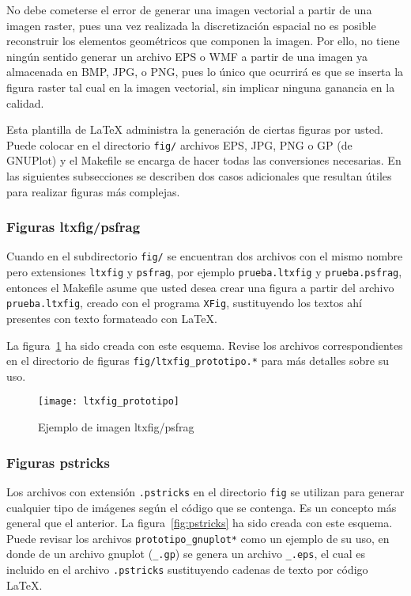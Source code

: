 No debe cometerse el error de generar una imagen vectorial a partir de una
imagen raster, pues una vez realizada la discretización espacial no es posible
reconstruir los elementos geométricos que componen la imagen. Por ello, no
tiene ningún sentido generar un archivo EPS o WMF a partir de una imagen ya
almacenada en BMP, JPG, o PNG, pues lo único que ocurrirá es que se inserta la
figura raster tal cual en la imagen vectorial, sin implicar ninguna ganancia en
la calidad.

Esta plantilla de LaTeX administra la generación de ciertas figuras por usted.
Puede colocar en el directorio \texttt{fig/} archivos EPS, JPG, PNG o GP (de
GNUPlot) y el Makefile se encarga de hacer todas las conversiones necesarias.
En las siguientes subsecciones se describen dos casos adicionales que resultan
útiles para realizar figuras más complejas.

\subsubsection{Figuras ltxfig/psfrag}

Cuando en el subdirectorio \texttt{fig/} se encuentran dos archivos con el
mismo nombre pero extensiones \texttt{ltxfig} y \texttt{psfrag}, por ejemplo
\texttt{prueba.ltxfig} y \texttt{prueba.psfrag}, entonces el Makefile asume que
usted desea crear una figura a partir del archivo \texttt{prueba.ltxfig},
creado con el programa \texttt{XFig}, sustituyendo los textos ahí presentes con
texto formateado con LaTeX.

La figura~\ref{fig:ltxfig} ha sido creada con este esquema.  Revise los
archivos correspondientes en el directorio de figuras
\texttt{fig/ltxfig\_prototipo.*} para más detalles sobre su uso.

\begin{figure}[htb]
  \centering
  \texttt{[image: ltxfig\_prototipo]}
  \caption{Ejemplo de imagen ltxfig/psfrag}
  \label{fig:ltxfig}
\end{figure}

\subsubsection{Figuras pstricks}  

Los archivos con extensión \texttt{.pstricks} en el directorio \texttt{fig} se
utilizan para generar cualquier tipo de imágenes según el código que se
contenga.  Es un concepto más general que el anterior.  La
figura~\ref{fig:pstricks} ha sido creada con este esquema.  Puede revisar los
archivos \texttt{prototipo\_gnuplot*} como un ejemplo de su uso, en donde de un
archivo gnuplot (\texttt{\_.gp}) se genera un archivo \texttt{\_.eps}, el cual
es incluido en el archivo \texttt{.pstricks} sustituyendo cadenas de texto por
código LaTeX.

